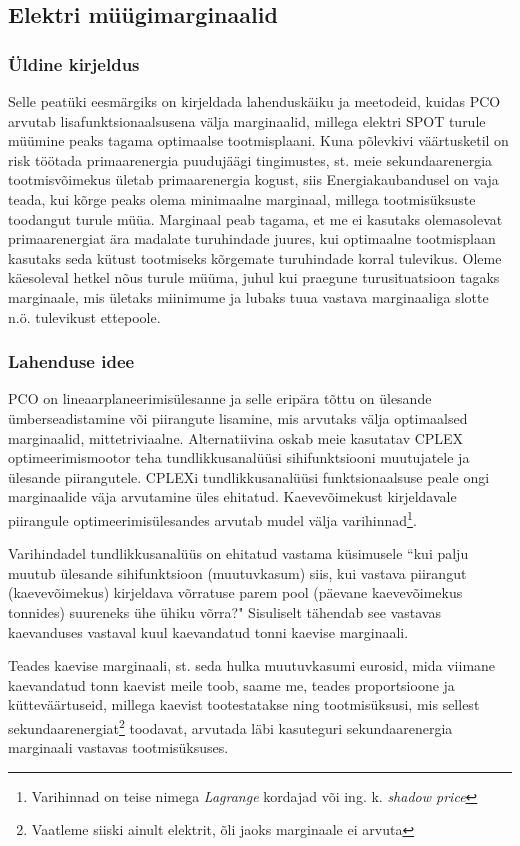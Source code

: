 \documentclass[10pt,a4paper]{article}
\begin{document}
\subsection{Elektri müügimarginaalid}
\subsubsection{Üldine kirjeldus}
Selle peatüki eesmärgiks on kirjeldada lahenduskäiku ja meetodeid, kuidas PCO arvutab lisafunktsionaalsusena välja marginaalid, millega elektri SPOT turule müümine peaks tagama optimaalse tootmisplaani. Kuna põlevkivi väärtusketil on risk töötada primaarenergia puudujäägi tingimustes, st. meie sekundaarenergia tootmisvõimekus ületab primaarenergia kogust, siis Energiakaubandusel on vaja teada, kui kõrge peaks olema minimaalne marginaal, millega tootmisüksuste toodangut turule müüa. Marginaal peab tagama, et me ei kasutaks olemasolevat primaarenergiat ära madalate turuhindade juures, kui optimaalne tootmisplaan kasutaks seda kütust tootmiseks kõrgemate turuhindade korral tulevikus. Oleme käesoleval hetkel nõus turule müüma, juhul kui praegune turusituatsioon tagaks marginaale, mis ületaks miinimume ja lubaks tuua vastava marginaaliga slotte n.ö. tulevikust ettepoole.

\subsubsection{Lahenduse idee}

PCO on lineaarplaneerimisülesanne ja selle eripära tõttu on ülesande ümber\-seadistamine või piirangute lisamine, mis arvutaks välja optimaalsed marginaalid, mittetriviaalne. Alternatiivina oskab meie kasutatav CPLEX optimeerimismootor teha tundlikkusanalüüsi sihifunktsiooni muutujatele ja ülesande piirangutele. CPLEXi tundlikkusanalüüsi funktsionaalsuse peale ongi marginaalide väja arvutamine üles ehitatud. Kaevevõimekust kirjeldavale piirangule optimeerimisülesandes arvutab mudel välja varihinnad\footnote{Varihinnad on teise nimega \emph{Lagrange} kordajad või ing. k. \emph{shadow price}}. 

Varihindadel tundlikkusanalüüs on ehitatud vastama küsimusele ``kui palju muutub ülesande sihifunktsioon (muutuvkasum) siis, kui vastava piirangut (kaevevõimekus) kirjeldava võrratuse parem pool (päevane kaevevõimekus tonnides) suureneks ühe ühiku võrra?" Sisuliselt tähendab see vastavas kaevanduses vastaval kuul kaevandatud tonni kaevise marginaali. 

Teades kaevise marginaali, st. seda hulka muutuvkasumi eurosid, mida viimane kaevandatud tonn kaevist meile toob, saame me, teades proportsioone ja kütteväärtuseid, millega kaevist tootestatakse ning tootmisüksusi, mis sellest sekundaarenergiat\footnote{Vaatleme siiski ainult elektrit, õli jaoks marginaale ei arvuta} toodavat, arvutada läbi kasuteguri sekundaarenergia marginaali vastavas tootmisüksuses.
\end{document}
